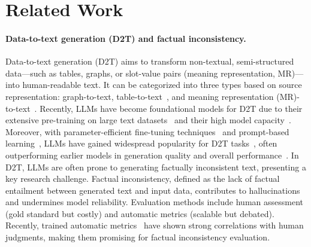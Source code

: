 \section{Related Work}
\label{sec:background}
\paragraph{Data-to-text generation (D2T) and factual inconsistency.}
Data-to-text generation (D2T)\citep{lin2024survey} aims to transform non-textual, semi-structured data---such as tables, graphs, or slot-value pairs (meaning representation, MR)---into human-readable text.
It can be categorized into three types based on source representation: graph-to-text\citep{gardent2017webnlg,nan2021dart}, table-to-text~\citep{bao2018table}, and meaning representation (MR)-to-text~\citep{novikova2017e2e,juraska2019viggo}.
Recently, LLMs have become foundational models for D2T due to their extensive pre-training on large text datasets~\citep{zhang2022opt} and their high model capacity~\citep{scao2022bloom}.
Moreover, with parameter-efficient fine-tuning techniques~\citep{dettmers2023qlora} and prompt-based learning~\citep{lester2021power}, LLMs have gained widespread popularity for D2T tasks~\citep{raffel2020exploring,lewis2020bart,scao2022bloom}, often outperforming earlier models in generation quality and overall performance~\citep{ge2023openagi}.
In D2T, LLMs are often prone to generating factually inconsistent text, presenting a key research challenge. 
Factual inconsistency, defined as the lack of factual entailment between generated text and input data, contributes to hallucinations and undermines model reliability.
Evaluation methods include human assessment (gold standard but costly) and automatic metrics (scalable but debated).
Recently, trained automatic metrics~\citep{fabbri2022qafacteval,zha2023alignscore} have shown strong correlations with human judgments, making them promising for factual inconsistency evaluation.

